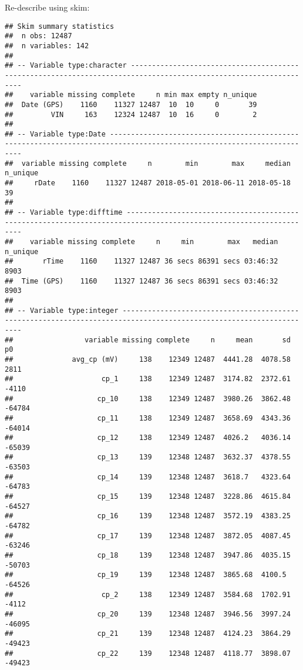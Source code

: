 \documentclass[]{article}
\begin{document}
Re-describe using skim:

\begin{verbatim}
## Skim summary statistics
##  n obs: 12487 
##  n variables: 142 
## 
## -- Variable type:character ------------------------------------------------------------------------------------------------------------------
##    variable missing complete     n min max empty n_unique
##  Date (GPS)    1160    11327 12487  10  10     0       39
##         VIN     163    12324 12487  10  16     0        2
## 
## -- Variable type:Date -----------------------------------------------------------------------------------------------------------------------
##  variable missing complete     n        min        max     median n_unique
##     rDate    1160    11327 12487 2018-05-01 2018-06-11 2018-05-18       39
## 
## -- Variable type:difftime -------------------------------------------------------------------------------------------------------------------
##    variable missing complete     n     min        max   median n_unique
##       rTime    1160    11327 12487 36 secs 86391 secs 03:46:32     8903
##  Time (GPS)    1160    11327 12487 36 secs 86391 secs 03:46:32     8903
## 
## -- Variable type:integer --------------------------------------------------------------------------------------------------------------------
##                 variable missing complete     n     mean       sd     p0
##              avg_cp (mV)     138    12349 12487  4441.28  4078.58   2811
##                     cp_1     138    12349 12487  3174.82  2372.61  -4110
##                    cp_10     138    12349 12487  3980.26  3862.48 -64784
##                    cp_11     138    12349 12487  3658.69  4343.36 -64014
##                    cp_12     138    12349 12487  4026.2   4036.14 -65039
##                    cp_13     139    12348 12487  3632.37  4378.55 -63503
##                    cp_14     139    12348 12487  3618.7   4323.64 -64783
##                    cp_15     139    12348 12487  3228.86  4615.84 -64527
##                    cp_16     139    12348 12487  3572.19  4383.25 -64782
##                    cp_17     139    12348 12487  3872.05  4087.45 -63246
##                    cp_18     139    12348 12487  3947.86  4035.15 -50703
##                    cp_19     139    12348 12487  3865.68  4100.5  -64526
##                     cp_2     138    12349 12487  3584.68  1702.91  -4112
##                    cp_20     139    12348 12487  3946.56  3997.24 -46095
##                    cp_21     139    12348 12487  4124.23  3864.29 -49423
##                    cp_22     139    12348 12487  4118.77  3898.07 -49423

\end{verbatim}
\end{document}
